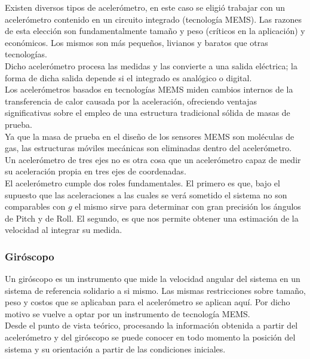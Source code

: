\documentclass[main]{subfiles}
\begin{document}
Existen diversos tipos de aceler\'ometro, en este caso se eligi\'o trabajar con un aceler\'ometro contenido en un circuito integrado (tecnolog\'ia MEMS). Las razones de esta elecci\'on son fundamentalmente tama\~no y peso (cr\'iticos en la aplicaci\'on) y econ\'omicos. Los mismos son m\'as peque\~nos, livianos y baratos que otras tecnolog\'ias.\\
Dicho aceler\'ometro procesa las medidas y las convierte a una salida el\'ectrica; la forma de dicha salida depende si el integrado es anal\'ogico o digital.\\
Los aceler\'ometros basados en tecnolog\'ias MEMS miden cambios internos de la transferencia de calor causada por la aceleraci\'on, ofreciendo ventajas significativas sobre el empleo de una estructura tradicional s\'olida de masas de prueba.\\
Ya que la masa de prueba en el dise\~no de los sensores MEMS son mol\'eculas de gas, las estructuras m\'oviles mec\'anicas son eliminadas dentro del aceler\'ometro.\\

Un aceler\'ometro de tres ejes no es otra cosa que un aceler\'ometro capaz de medir su aceleraci\'on propia en tres ejes de coordenadas.\\


El aceler\'ometro cumple dos roles fundamentales. El primero es que, bajo el supuesto que las aceleraciones a las cuales se ver\'a sometido el sistema no son comparables con $g$ el mismo sirve para determinar con gran precisi\'on los \'angulos de Pitch y de Roll. El segundo, es que nos permite obtener una estimaci\'on de la velocidad al integrar su medida.  
 
\subsubsection{Gir\'oscopo}
\label{giro}

Un gir\'oscopo es un instrumento que mide la velocidad angular del sistema en un sistema de referencia solidario a si mismo. Las mismas restricciones sobre tama\~no, peso y costos que se aplicaban para el aceler\'ometro se aplican aqu\'i. Por dicho motivo se vuelve a optar por un instrumento de tecnolog\'ia MEMS.\\ 

Desde el punto de vista te\'orico, procesando la informaci\'on obtenida a partir del aceler\'ometro y del gir\'oscopo se puede conocer en todo momento la posici\'on del sistema y su orientaci\'on a partir de las condiciones iniciales.\\
\end{document}
